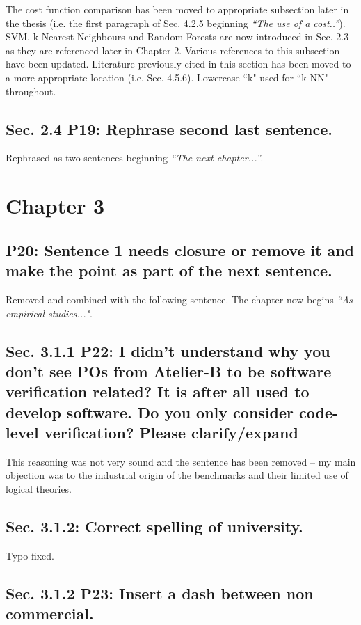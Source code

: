 \documentclass[]{article}
\begin{document}
The cost function comparison has been moved to appropriate subsection later in the thesis (i.e. the first paragraph of Sec. 4.2.5 beginning \emph{``The use of a cost..''}).
SVM, k-Nearest Neighbours and Random Forests are now introduced in Sec. 2.3 as they are referenced later in Chapter 2. 
Various references to this subsection have been updated.
Literature previously cited in this section has been moved to a more appropriate location (i.e. Sec. 4.5.6). 
Lowercase ``k" used for ``k-NN" throughout.

\subsection{Sec. 2.4 P19: Rephrase second last sentence.}

Rephrased as two sentences beginning \emph{``The next chapter...''}.

\section{Chapter 3}

\subsection{P20: Sentence 1 needs closure or remove it and make the point as part of the next sentence.}

Removed and combined with the following sentence. The chapter now begins \emph{``As empirical studies..."}.

\subsection{Sec. 3.1.1 P22: I didn't understand why you don't see POs from Atelier-B to be software verification related? It is after all used to develop software. Do you only consider code-level verification? Please clarify/expand}

This reasoning was not very sound and the sentence has been removed -- my main objection was to the industrial origin of the benchmarks and their limited use of logical theories.

\subsection{Sec. 3.1.2: Correct spelling of university.}

Typo fixed.

\subsection{Sec. 3.1.2 P23: Insert a dash between non commercial.}
\end{document}
